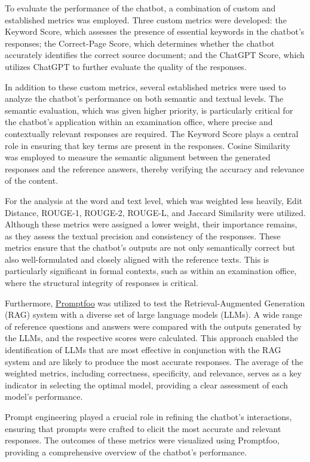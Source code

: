 \documentclass[conference]{IEEEtran}
\begin{document}
To evaluate the performance of the chatbot, a combination of custom and established metrics was employed. Three custom metrics were developed: the Keyword Score, which assesses the presence of essential keywords in the chatbot’s responses; the Correct-Page Score, which determines whether the chatbot accurately identifies the correct source document; and the ChatGPT Score, which utilizes ChatGPT to further evaluate the quality of the responses.

In addition to these custom metrics, several established metrics were used to analyze the chatbot’s performance on both semantic and textual levels. The semantic evaluation, which was given higher priority, is particularly critical for the chatbot’s application within an examination office, where precise and contextually relevant responses are required. The Keyword Score plays a central role in ensuring that key terms are present in the responses. Cosine Similarity was employed to measure the semantic alignment between the generated responses and the reference answers, thereby verifying the accuracy and relevance of the content.

For the analysis at the word and text level, which was weighted less heavily, Edit Distance, ROUGE-1, ROUGE-2, ROUGE-L, and Jaccard Similarity were utilized. Although these metrics were assigned a lower weight, their importance remains, as they assess the textual precision and consistency of the responses. These metrics ensure that the chatbot’s outputs are not only semantically correct but also well-formulated and closely aligned with the reference texts. This is particularly significant in formal contexts, such as within an examination office, where the structural integrity of responses is critical.

Furthermore, \href{https://www.promptfoo.dev/}{Promptfoo} was utilized to test the Retrieval-Augmented Generation (RAG) system with a diverse set of large language models (LLMs). A wide range of reference questions and answers were compared with the outputs generated by the LLMs, and the respective scores were calculated. This approach enabled the identification of LLMs that are most effective in conjunction with the RAG system and are likely to produce the most accurate responses. The average of the weighted metrics, including correctness, specificity, and relevance, serves as a key indicator in selecting the optimal model, providing a clear assessment of each model’s performance.

Prompt engineering played a crucial role in refining the chatbot’s interactions, ensuring that prompts were crafted to elicit the most accurate and relevant responses. The outcomes of these metrics were visualized using Promptfoo, providing a comprehensive overview of the chatbot’s performance.
\end{document}
